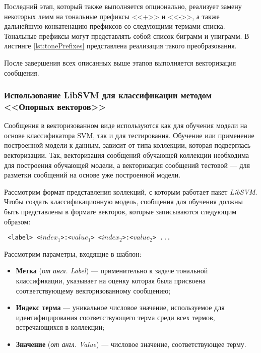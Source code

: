     Последний этап, который также выполняется опционально, реализует замену
    некоторых лемм на тональные префиксы <<+>> и <<->>, а также дальнейшую
    конкатенацию префиксов со следующими термами списка. Тональные префиксы
    могут представлять собой список биграмм и униграмм. В листинге
    \ref{lst:tonePrefixes} представлена реализация такого преобразования.

    \lstset{style=python}
    


    После завершения всех описанных выше этапов выполняется векторизация
    сообщения.

    \subsubsection{Использование LibSVM для классификации методом <<Опорных векторов>>}

    Сообщения в векторизованном виде используются как для обучения
    модели на основе классификатора SVM, так и для тестирования.
    Обучение или применение построенной модели к данным, зависит от типа коллекции,
    которая подверглась векторизации.
    Так, векторизация сообщений обучающей коллекции необходима для построения
    обучающей модели, а векторизация сообщений тестовой --- для разметки сообщений
    на основе уже построенной модели.

    Рассмотрим формат представления коллекций, с которым работает пакет {\it LibSVM}.
    Чтобы создать классификационную модель, сообщения для обучения должны быть
    представлены в формате векторов, которые записываются следующим образом:
    \begin{center}
        \tt
        <label> <$index_1$>:<$value_1$> <$index_2$>:<$value_2$> ...
    \end{center}

    Рассмотрим параметры, входящие в шаблон:
    \begin{itemize}
        \item {\bf Метка} ({\it от англ. Label}) --- применительно к задаче
        тональной классификации, указывает на оценку которая была присвоена
        соответствующему векторизованному сообщению;
        \item {\bf Индекс терма} --- уникальное числовое значение, используемое
        для идентифицирования соответствующего терма среди всех термов, встречающихся
        в коллекции;
        \item {\bf Значение} ({\it от англ. Value}) --- числовое значение,
        соответствующее терму.
    \end{itemize}

